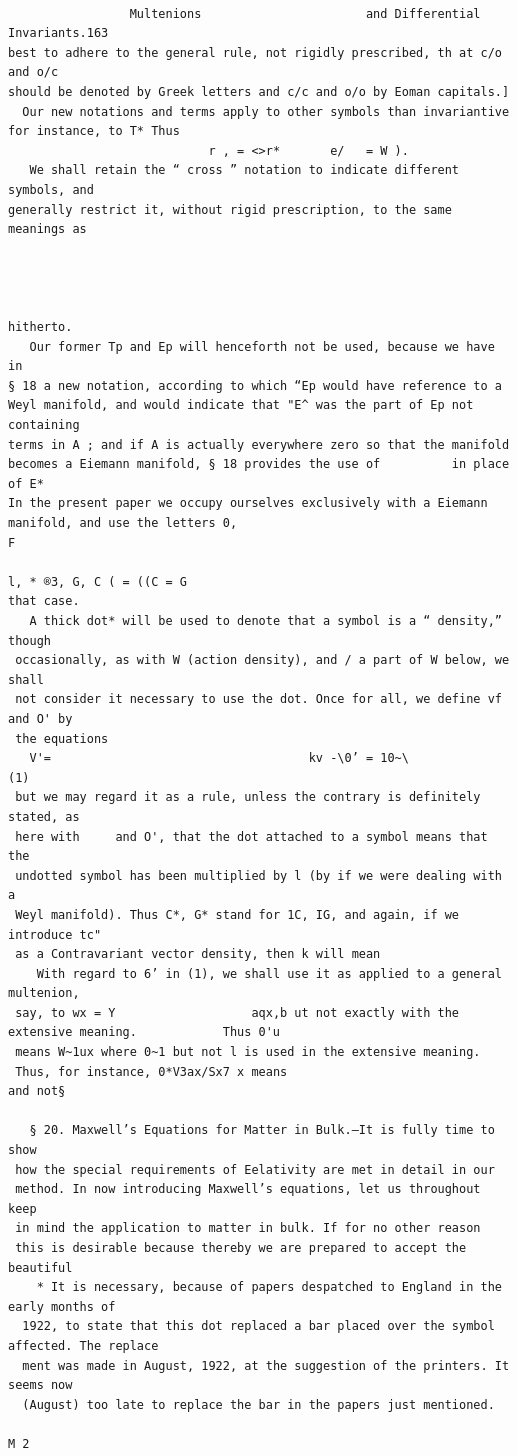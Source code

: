 \documentclass[10pt]{article}
\begin{document}
\clearpage
\begin{verbatim}

                 Multenions                       and Differential Invariants.163
best to adhere to the general rule, not rigidly prescribed, th at c/o and o/c
should be denoted by Greek letters and c/c and o/o by Eoman capitals.]
  Our new notations and terms apply to other symbols than invariantive
for instance, to T* Thus
                            r , = <>r*       e/   = W ).
   We shall retain the “ cross ” notation to indicate different symbols, and
generally restrict it, without rigid prescription, to the same meanings as




hitherto.
   Our former Tp and Ep will henceforth not be used, because we have in
§ 18 a new notation, according to which “Ep would have reference to a
Weyl manifold, and would indicate that "E^ was the part of Ep not containing
terms in A ; and if A is actually everywhere zero so that the manifold
becomes a Eiemann manifold, § 18 provides the use of          in place of E*
In the present paper we occupy ourselves exclusively with a Eiemann
manifold, and use the letters 0,                                      F
                                                                      l, * ®3, G, C ( = ((C = G
that case.
   A thick dot* will be used to denote that a symbol is a “ density,” though
 occasionally, as with W (action density), and / a part of W below, we shall
 not consider it necessary to use the dot. Once for all, we define vf and O' by
 the equations
   V'=                                    kv -\0’ = 10~\                      (1)
 but we may regard it as a rule, unless the contrary is definitely stated, as
 here with     and O', that the dot attached to a symbol means that the
 undotted symbol has been multiplied by l (by if we were dealing with a
 Weyl manifold). Thus C*, G* stand for 1C, IG, and again, if we introduce tc"
 as a Contravariant vector density, then k will mean
    With regard to 6’ in (1), we shall use it as applied to a general multenion,
 say, to wx = Y                   aqx,b ut not exactly with the extensive meaning.            Thus 0'u
 means W~1ux where 0~1 but not l is used in the extensive meaning.
 Thus, for instance, 0*V3ax/Sx7 x means                                and not§

   § 20. Maxwell’s Equations for Matter in Bulk.—It is fully time to show
 how the special requirements of Eelativity are met in detail in our
 method. In now introducing Maxwell’s equations, let us throughout keep
 in mind the application to matter in bulk. If for no other reason
 this is desirable because thereby we are prepared to accept the beautiful
    * It is necessary, because of papers despatched to England in the early months of
  1922, to state that this dot replaced a bar placed over the symbol affected. The replace­
  ment was made in August, 1922, at the suggestion of the printers. It seems now
  (August) too late to replace the bar in the papers just mentioned.
                                                                              M 2


\end{verbatim}
\end{document}
